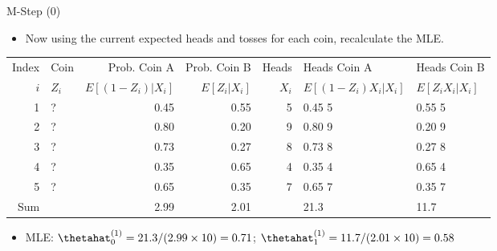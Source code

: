 \documentclass[dvipdfmx,bigger,aspectratio=169]{beamer}
\begin{document}
\begin{frame}[allowframebreaks,label=,t]{M-Step (0)}
\begin{itemize}
\item Now using the current expected heads and tosses for each coin, recalculate the MLE.
\end{itemize}
\footnotesize
\begin{center}
\begin{tabular}{r|l|rr|r|ll|}
Index & Coin & Prob. Coin A & Prob. Coin B & Heads & Heads Coin A & Heads Coin B\\
\(i\) & \(Z_{i}\) & \(E[(1-Z_{i})\vert X_{i}]\) & \(E[Z_{i}\vert X_{i}]\) & \(X_{i}\) & \(E[(1-Z_{i}) X_{i} \vert X_{i}]\) & \(E[Z_{i} X_{i} \vert X_{i}]\)\\
\hline
1 & ? & 0.45 & 0.55 & 5 & 0.45 \texttimes{} 5 & 0.55 \texttimes{} 5\\
2 & ? & 0.80 & 0.20 & 9 & 0.80 \texttimes{} 9 & 0.20 \texttimes{} 9\\
3 & ? & 0.73 & 0.27 & 8 & 0.73 \texttimes{} 8 & 0.27 \texttimes{} 8\\
4 & ? & 0.35 & 0.65 & 4 & 0.35 \texttimes{} 4 & 0.65 \texttimes{} 4\\
5 & ? & 0.65 & 0.35 & 7 & 0.65 \texttimes{} 7 & 0.35 \texttimes{} 7\\
\hline
Sum &  & 2.99 & 2.01 &  & 21.3 & 11.7\\
\end{tabular}
\end{center}
\normalsize
\begin{itemize}
\item MLE: \(\thetahat_{0}^{(1)} = 21.3 / (2.99 \times 10) = 0.71\); \(\thetahat_{1}^{(1)} = 11.7 / (2.01 \times 10) = 0.58\)
\end{itemize}
\end{frame}
\end{document}
